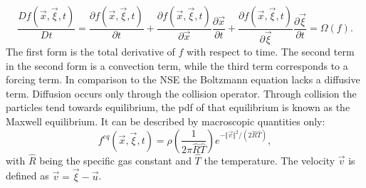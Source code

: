 \begin{equation}
	\frac{D f(\vec{x}, \vec{\xi}, t)}{Dt} = \frac{ \partial f(\vec{x}, \vec{\xi}, t)}{\partial t} + \frac{ \partial f(\vec{x}, \vec{\xi}, t)}{\partial\vec{x}} \frac{\partial \vec{x}}{\partial t} + \frac{ \partial f(\vec{x}, \vec{\xi}, t)}{\partial \vec{\xi}} \frac{\partial \vec{\xi}}{\partial t} =  \Omega(f). \label{eq:boltzmann}
\end{equation}
 The first form is the total derivative of $f$ with respect to time. The second term in the second form is a convection term, while the third term corresponds to a forcing term. In comparison to the NSE the Boltzmann equation lacks a diffusive term. Diffusion occurs only through the collision operator. Through collision the particles tend towards equilibrium, the pdf of that equilibrium is known as the Maxwell equilibrium. It can be described by macroscopic quantities only:
\begin{equation}
	f^{eq} (\vec{x}, \vec{\xi}, t) = \rho\left(\frac{1}{2 \pi \hat{R}\hat{T}}\right) e^{-\Vert \vec{v} \Vert^2/(2\hat{R}\hat{T}) }, \label{eq:equilibrium}
\end{equation}
with $\hat{R}$ being the specific gas constant and $\hat{T}$ the temperature. The velocity $\vec{v}$ is defined as $\vec{v} = \vec{\xi}-\vec{u}$. \cite[p. 15- 21]{kruger_lattice_2017} \\
